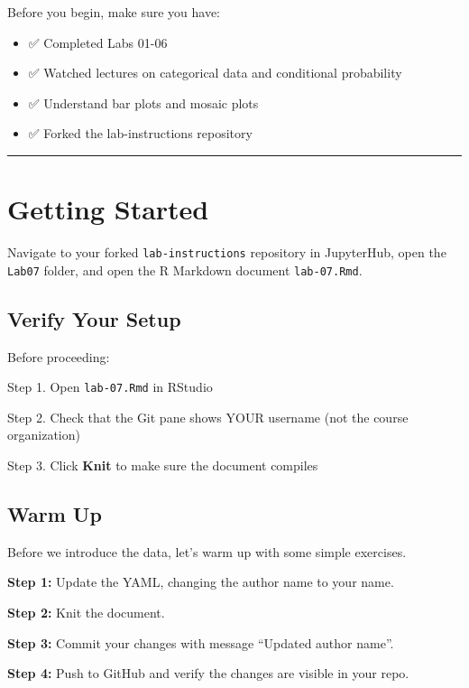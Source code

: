 \documentclass[]{tufte-handout}
\providecommand{\tightlist}{%
  \setlength{\itemsep}{0pt}\setlength{\parskip}{0pt}}
\begin{document}
Before you begin, make sure you have:

\begin{itemize}
\tightlist
\item
  ✅ Completed Labs 01-06
\item
  ✅ Watched lectures on categorical data and conditional probability
\item
  ✅ Understand bar plots and mosaic plots
\item
  ✅ Forked the lab-instructions repository
\end{itemize}

\begin{center}\rule{0.5\linewidth}{0.5pt}\end{center}

\section{Getting Started}\label{getting-started}

Navigate to your forked \texttt{lab-instructions} repository in
JupyterHub, open the \texttt{Lab07} folder, and open the R Markdown
document \texttt{lab-07.Rmd}.

\subsection{Verify Your Setup}\label{verify-your-setup}

Before proceeding:

Step 1. Open \texttt{lab-07.Rmd} in RStudio

Step 2. Check that the Git pane shows YOUR username (not the course
organization)

Step 3. Click \textbf{Knit} to make sure the document compiles

\subsection{Warm Up}\label{warm-up}

Before we introduce the data, let's warm up with some simple exercises.

\textbf{Step 1:} Update the YAML, changing the author name to your name.

\textbf{Step 2:} Knit the document.

\textbf{Step 3:} Commit your changes with message ``Updated author
name''.

\textbf{Step 4:} Push to GitHub and verify the changes are visible in
your repo.
\end{document}
